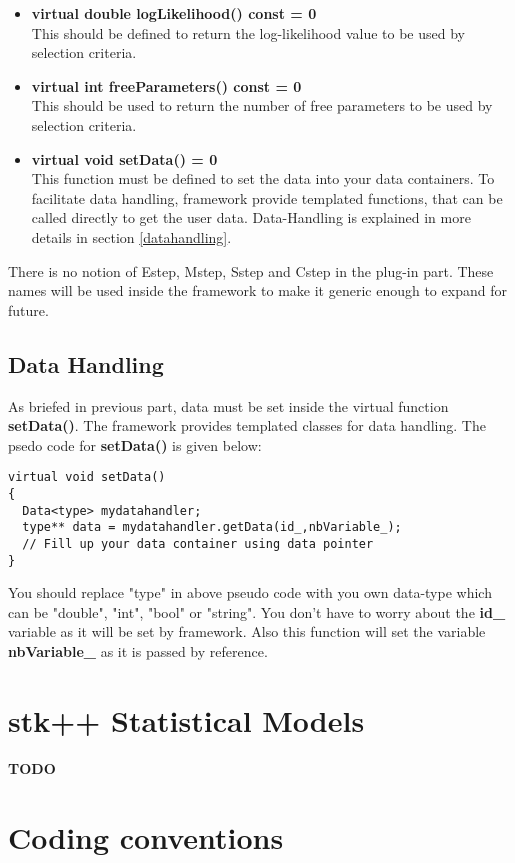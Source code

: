 \documentclass[a4paper,11pt]{article}
\begin{document}
\begin{itemize}
\item {\bf virtual double logLikelihood() const = 0}\\
This should be defined to return the log-likelihood value to be used by selection criteria.
\item {\bf virtual int freeParameters() const = 0}\\
This should be used to return the number of free parameters to be used by selection criteria.
\item {\bf virtual void setData() = 0}\\
This function must be defined to set the data into your data containers. To facilitate data handling, framework provide templated functions,
that can be called directly to get the user data. Data-Handling is explained in more details in section \ref{datahandling}.
\end{itemize}

There is no notion of Estep, Mstep, Sstep and Cstep in the plug-in part. These names will be used inside the framework to make
it generic enough to expand for future. 

\subsection{Data Handling}
As briefed in previous part, data must be set inside the virtual function {\bf setData()}. The framework provides templated classes for data handling. The 
psedo code for {\bf setData()} is given below:
\begin{lstlisting}
virtual void setData()
{
  Data<type> mydatahandler;
  type** data = mydatahandler.getData(id_,nbVariable_);
  // Fill up your data container using data pointer
}
\end{lstlisting}
You should replace "type" in above pseudo code with you own data-type which can be {"double", "int", "bool" or "string"}. You don't have to worry about the 
{\bf id\_} variable as it will be set by framework. Also this function will set the variable {\bf nbVariable\_} as it is passed by reference.

\label{datahandling}
\section{stk++ Statistical Models}

{\bf TODO}

\appendix

\section{Coding conventions}
\end{document}
